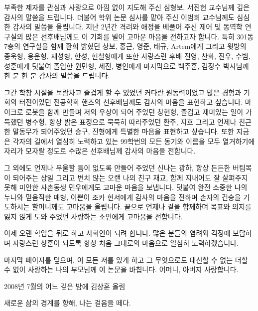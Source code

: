 \documentclass[11pt, a4paper, oneside, openany, reqno]{book}
\theoremstyle{definition}
\theoremstyle{remark}
\numberwithin{equation}{chapter} %
\begin{document}
\newpage\thispagestyle{empty}\mbox{}\newpage\noindent
\begin{KoreanAcknowledgement}
부족한 제자를 관심과 사랑으로 아낌 없이 지도해 주신 
심형보, 서진헌 교수님께 깊은 감사의 말씀을 드립니다. 더불어 학위 논문 심사를
맡아 주신 이범희 교수님께도 심심한 감사의 말씀을 올립니다.
지난 2년간 격려와 애정을 베풀어 주신 제어 및 동역학 연구실의 많은 선후배님께도  
이 기회를 빌어 고마운 마음을 전하고자 합니다.
특히 301동 7층의 연구실을 함께 환희 밝혔던 상보, 홍근, 영준, 태규, Artem에게 
그리고 윗방의 종욱형, 용운형, 재성형, 한성, 현철형에게 
또한 사랑스런 후배 진영, 찬화, 진우, 수범, 성훈에게
덧붙여 졸업한 원민형, 세진, 병인에게 
마지막으로 백주훈, 김정수 박사님께 한 분 한 분 감사의 말씀을 드립니다.

그간 학창 시절을 보람차고 즐겁게 할 수 있었던 커다란 원동력이었고
많은 경험과 기회의 터전이었던 전공학회 핸즈의 선후배님께도 감사의 마음을 표현하고 싶습니다.
마이크로 로봇을 함께 만들며 저의 우상이 되어 주었던 창현형, 즐겁고 재미있는 일이 가득했던 병수형,
항상 밝은 표정으로 묵묵히 따라주었던 환주, 지호 그리고 언제나 친근한 말동무가 되어주었던 승구, 진형에게
특별한 마음을 표현하고 싶습니다. 또한 지금은 각자의 길에서 열심히 노력하고 있는 99학번의 모든 동기와
이름을 모두 열거하기에 자리가 모자랄 정도로 수많은 선후배님께 감사의 마음을 전합니다.

그 외에도 언제나 우울할 틈이 없도록 만들어 주었던 신나는 광하, 
항상 든든한 버팀목이 되어주는 상일 그리고 변치 않는 오랜 나의 친구 재교, 
함께 지내어도 잘 살펴주지 못해 미안한 사촌동생 민우에게도 고마운 마음을 보냅니다.
덧붙여 완전 소중한 나의 누나와 믿음직한 매형, 이쁜이 조카 현서에게 감사의 마음을 전하며
손자의 건승을 기도하시는 할머니께도 고마움을 올립니다.
끝으로 언제나 곁을 함께하며 목표와 의지를 잃지 않게 도와 주었던 사랑하는 소연에게 고마움을 전합니다.

이제 오랜 학업을 뒤로 하고 사회인이 되려 합니다.
많은 분들의 염려와 걱정에 보답하며 자랑스런 상훈이 되도록 항상 처음 그대로의 마음으로 열심히 노력하겠습니다.

마지막 페이지를 덮으며, 
이 모든 저를 있게 하고 그 무엇으로도 대신할 수 없는 더할 수 없이 사랑하는 나의 부모님께 이 논문을 바칩니다.
어머니, 아버지 사랑합니다.
\begin{flushright}
2008년 7월의 어느 깊은 밤에 김상훈 올림
\end{flushright}
\end{KoreanAcknowledgement}



\newpage\thispagestyle{empty} \noindent 
\null \vfill
\begin{center}
\noindent  새로운 삶의 경계를 향해, 나는 걸음을 떼다.\\ 
\end{center}
\vfill



\newpage\thispagestyle{empty}\mbox{}\newpage
\newpage\thispagestyle{empty}\mbox{}\newpage
\end{document}
